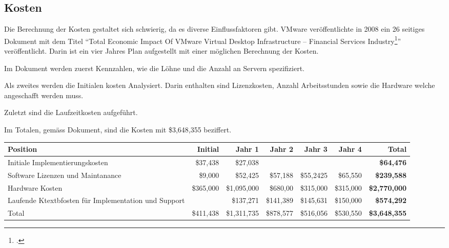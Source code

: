 \subsection{Kosten}
\label{sec:vmwareCosts}
Die Berechnung der Kosten gestaltet sich schwierig, da es diverse Einflussfaktoren gibt.
VMware veröffentlichte in 2008 ein 26 seitiges Dokument mit dem Titel "`Total Economic Impact Of VMware Virtual Desktop Infrastructure – Financial Services Industry\footcite{Forrester_Report}"' veröffentlicht. Darin ist ein vier Jahres Plan aufgestellt mit einer möglichen Berechnung der Kosten.

Im Dokument werden zuerst Kennzahlen, wie die Löhne und die Anzahl an Servern spezifiziert.

Als zweites werden die Initialen kosten Analysiert. Darin enthalten sind Lizenzkosten, Anzahl Arbeitsstunden sowie die Hardware welche angeschafft werden muss.

Zuletzt sind die Laufzeitkosten aufgeführt.

Im Totalen, gemäss Dokument, sind die Kosten mit \$3,648,355 beziffert.

\begin{table}[H]
	\centering
	\small\renewcommand{\arraystretch}{1.4}
	\begin{tabularx}{\textwidth}{X | r | r | r | r | r | r}
		\hline
		\rowcolor{tableheadcolor}
		\textbf{Position} & \textbf{Initial} & \textbf{Jahr 1} & \textbf{Jahr 2} & \textbf{Jahr 3} & \textbf{Jahr 4} & \textbf{Total} \\
		\hline
		Initiale Implementierungskosten & \$37,438 & \$27,038 &  &  &  & \textbf{\$64,476} \\
		Software Lizenzen und \linebreak
		Maintanance & \$9,000 & \$52,425 & \$57,188 & \$55,2425 & \$65,550 & \textbf{\$239,588} \\
		Hardware Kosten & \$365,000 & \$1,095,000 & \$680,00 & \$315,000 & \$315,000 & \textbf{\$2,770,000} \\
		Laufende Ktextbfosten für \linebreak
		Implementation und Support &  & \$137,271 & \$141,389 & \$145,631 & \$150,000 & \textbf{\$574,292} \\
		\hline
		\rowcolor{tableheadcolor}
		Total & \$411,438 & \$1,311,735 & \$878,577 & \$516,056 & \$530,550 & \textbf{\$3,648,355} \\
	\end{tabularx}
\end{table}

